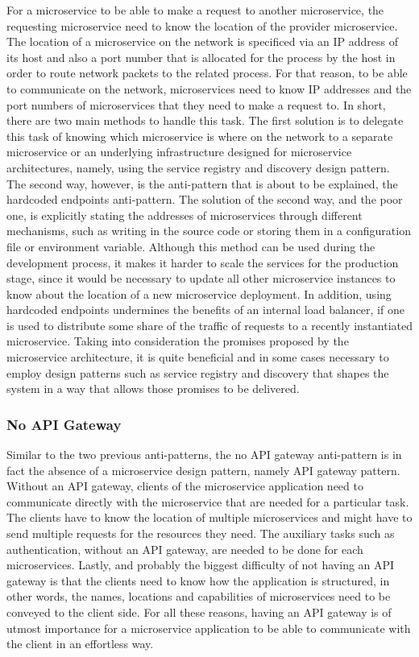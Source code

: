 \documentclass{Configuration_Files/PoliMi3i_thesis}
\begin{document}
For a microservice to be able to make a request to another microservice, the requesting microservice need to know the location of the provider microservice.
The location of a microservice on the network is specificed via an IP address of its host and also a port number that is allocated for the process by the host in order to route network packets to the related process.
For that reason, to be able to communicate on the network, microservices need to know IP addresses and the port numbers of microservices that they need to make a request to.
In short, there are two main methods to handle this task.
The first solution is to delegate this task of knowing which microservice is where on the network to a separate microservice or an underlying infrastructure designed for microservice architectures, namely, using the service registry and discovery design pattern.
The second way, however, is the anti-pattern that is about to be explained, the hardcoded endpoints anti-pattern.
The solution of the second way, and the poor one, is explicitly stating the addresses of microservices through different mechanisms, such as writing in the source code or storing them in a configuration file or environment variable.
Although this method can be used during the development process, it makes it harder to scale the services for the production stage, since it would be necessary to update all other microservice instances to know about the location of a new microservice deployment.
In addition, using hardcoded endpoints undermines the benefits of an internal load balancer, if one is used to distribute some share of the traffic of requests to a recently instantiated microservice.
Taking into consideration the promises proposed by the microservice architecture, it is quite beneficial and in some cases necessary to employ design patterns such as service registry and discovery that shapes the system in a way that allows those promises to be delivered.

\subsubsection{No API Gateway}
\label{subsubsec:no_api_gateway}

Similar to the two previous anti-patterns, the no API gateway anti-pattern is in fact the absence of a microservice design pattern, namely API gateway pattern.
Without an API gateway, clients of the microservice application need to communicate directly with the microservice that are needed for a particular task.
The clients have to know the location of multiple microservices and might have to send multiple requests for the resources they need.
The auxiliary tasks such as authentication, without an API gateway, are needed to be done for each microservices.
Lastly, and probably the biggest difficulty of not having an API gateway is that the clients need to know how the application is structured, in other words, the names, locations and capabilities of microservices need to be conveyed to the client side.
For all these reasons, having an API gateway is of utmost importance for a microservice application to be able to communicate with the client in an effortless way.
\end{document}
